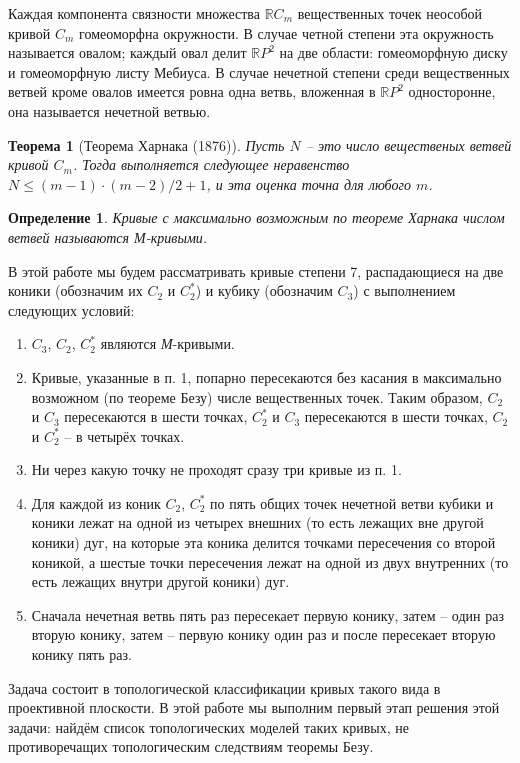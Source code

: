 \documentclass[14pt]{article}
\newtheorem{theorem}{Теорема}
\newtheorem{definition}{Определение}
\begin{document}
Каждая компонента связности множества  $\mathbb RC_m$ вещественных точек неособой кривой $C_m$ гомеоморфна окружности. В случае четной степени эта окружность называется овалом; каждый овал делит $\mathbb RP^2$ на две области: гомеоморфную диску и гомеоморфную листу Мебиуса. В случае нечетной степени среди вещественных ветвей кроме овалов имеется ровна одна ветвь, вложенная в $\mathbb RP^2$ односторонне, она называется нечетной ветвью.

\begin{theorem}[Теорема Харнака (1876)]
Пусть $N$ -- это число вещественых ветвей кривой $C_m$. Тогда выполняется следующее неравенство $N \leqslant (m - 1) \cdot (m - 2)/2 + 1$, и эта оценка точна для любого $m$.
\end{theorem}

\begin{definition}
Кривые с максимально возможным по теореме Харнака числом ветвей называются М-кривыми.
\end{definition}

В этой работе мы будем рассматривать кривые степени 7, распадающиеся на две коники (обозначим их $C_2$ и $C_2^*$) и кубику (обозначим $C_3$) с выполнением следующих условий:

\begin{enumerate}
\item $C_3$, $C_2$, $C_2^*$ являются \textit{М}-кривыми.
\item Кривые, указанные в п. 1, попарно пересекаются без касания в максимально возможном (по теореме Безу) числе вещественных точек. Таким образом, $C_2$ и $C_3$ пересекаются в шести точках, $C_2^*$ и $C_3$ пересекаются в шести точках, $C_2$ и $C_2^*$ -- в  четырёх точках. 
\item Ни через какую точку не проходят сразу три кривые из п. 1.
\item Для каждой из коник $C_2$, $C_2^*$ по пять общих точек нечетной ветви кубики и коники лежат на одной из четырех внешних (то есть лежащих вне другой коники) дуг, на которые эта коника делится точками пересечения со второй коникой, а шестые точки пересечения лежат на одной из двух внутренних (то есть лежащих внутри другой коники) дуг.
\item Сначала нечетная ветвь пять раз пересекает первую конику, затем -- один раз вторую конику, затем -- первую конику один раз  и после пересекает вторую конику пять раз.
\end{enumerate}

Задача состоит в топологической классификации кривых такого вида в проективной плоскости. В этой работе мы выполним первый этап решения этой задачи: найдём список топологических моделей таких кривых, не противоречащих топологическим следствиям теоремы Безу.
\end{document}
